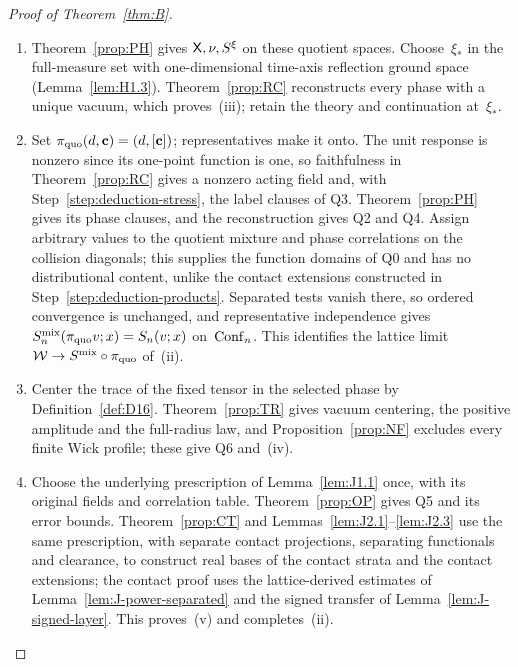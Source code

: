 \begin{proof}[Proof of Theorem~\ref{thm:B}]
\begin{enumerate}[label=\textup{\arabic*.},ref=\arabic*,itemsep=0.25em]
\item\label{step:deduction-phase} Theorem~\ref{prop:PH} gives $\mathsf{X},\nu,S^\xi$ on these quotient spaces. Choose~$\xi_*$ in the full-measure set with one-dimensional time-axis reflection ground space (Lemma~\ref{lem:H1.3}). Theorem~\ref{prop:RC} reconstructs every phase with a unique vacuum, which proves~(iii); retain the theory and continuation at~$\xi_*$.

\item\label{step:deduction-hierarchy} Set $\pi_{\rm quo}(d,\mathbf c)=(d,[\mathbf c])$; representatives make it onto. The unit response is nonzero since its one-point function is one, so faithfulness in Theorem~\ref{prop:RC} gives a nonzero acting field and, with Step~\ref{step:deduction-stress}, the label clauses of Q3. Theorem~\ref{prop:PH} gives its phase clauses, and the reconstruction gives Q2 and Q4. Assign arbitrary values to the quotient mixture and phase correlations on the collision diagonals; this supplies the function domains of Q0 and has no distributional content, unlike the contact extensions constructed in Step~\ref{step:deduction-products}. Separated tests vanish there, so ordered convergence is unchanged, and representative independence gives $S_n^{\rm mix}(\pi_{\rm quo}v;x)=S_n(v;x)$ on~$\mathrm{Conf}_{n}$. This identifies the lattice limit $\mathcal W\to S^{\rm mix}\circ\pi_{\rm quo}$ of~(ii).

\item\label{step:deduction-trace} Center the trace of the fixed tensor in the selected phase by Definition~\ref{def:D16}. Theorem~\ref{prop:TR} gives vacuum centering, the positive amplitude and the full-radius law, and Proposition~\ref{prop:NF} excludes every finite Wick profile; these give Q6 and~(iv).

\item\label{step:deduction-products} Choose the underlying prescription of Lemma~\ref{lem:J1.1} once, with its original fields and correlation table. Theorem~\ref{prop:OP} gives Q5 and its error bounds. Theorem~\ref{prop:CT} and Lemmas~\ref{lem:J2.1}--\ref{lem:J2.3} use the same prescription, with separate contact projections, separating functionals and clearance, to construct real bases of the contact strata and the contact extensions; the contact proof uses the lattice-derived estimates of Lemma~\ref{lem:J-power-separated} and the signed transfer of Lemma~\ref{lem:J-signed-layer}. This proves~(v) and completes~(ii).\qedhere
\end{enumerate}
\end{proof}

